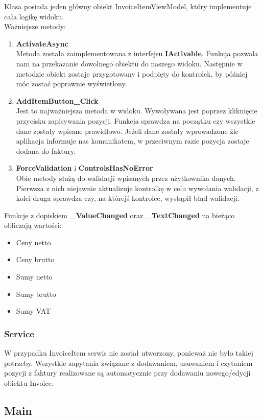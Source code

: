 Klasa posiada jeden główny obiekt InvoiceItemViewModel, który implementuje cała logikę widoku.
\\
Ważniejsze metody:
\begin{enumerate}
    \item \textbf{ActivateAsync} \\
    Metoda została zaimplementowana z interfejsu \textbf{IActivable}. Funkcja pozwala nam na przekazanie dowolnego obiektu do naszego widoku. Następnie w metodzie obiekt zostaje przygotowany i podpięty do kontrolek, by później móc zostać poprawnie wyświetlony. 
    \item \textbf{AddItemButton\_Click}\\
    Jest to najważniejsza metoda w widoku. Wywoływana jest poprzez kliknięcie przycisku zapisywania pozycji. Funkcja sprawdza na początku czy wszystkie dane zostały wpisane prawidłowo. Jeżeli dane zostały wprowadzone źle aplikacja informuje nas komunikatem, w przeciwnym razie pozycja zostaje dodana do faktury.
    \item \textbf{ForceValidation} i \textbf{ControlsHasNoError} \\
    Obie metody służą do walidacji wpisanych przez użytkownika danych. Pierwsza z nich niejawnie aktualizuje kontrolkę w celu wywołania walidacji, z kolei druga sprawdza czy, na którejś kontrolce, wystąpił błąd walidacji.
\end{enumerate}

Funkcje z dopiskiem \textbf{\_ValueChanged} oraz \textbf{\_TextChanged} na bieżąco obliczają wartości: 
\begin{itemize}
    \item Ceny netto
    \item Ceny brutto
    \item Sumy netto
    \item Sumy brutto
    \item Sumy VAT
\end{itemize}

\subsubsection{Service}
W przypadku InvoiceItem serwis nie został utworzony, ponieważ nie było takiej potrzeby. Wszystkie zapytania związane z dodawaniem, usuwaniem i czytaniem pozycji z faktury realizowane są automatycznie przy dodawaniu nowego/edycji obiektu Invoice.

\subsection{Main}

